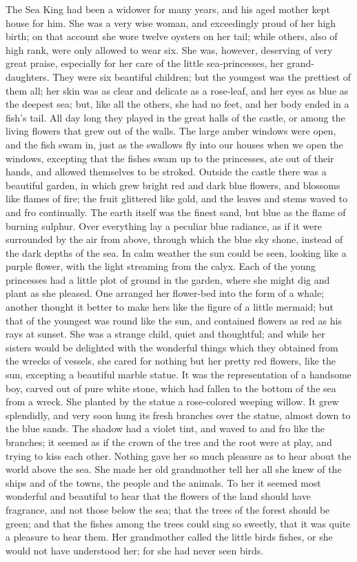 The Sea King had been a widower for many years, and his aged
mother kept house for him. 
She was a very wise woman, and
exceedingly proud of her high birth; on that account she wore twelve
oysters on her tail; while others, also of high rank, were only
allowed to wear six. 
She was, however, deserving of very great praise,
especially for her care of the little sea-princesses, her
grand-daughters. 
They were six beautiful children; but the youngest
was the prettiest of them all; her skin was as clear and delicate as a
rose-leaf, and her eyes as blue as the deepest sea; but, like all
the others, she had no feet, and her body ended in a fish's tail.
All day long they played in the great halls of the castle, or among
the living flowers that grew out of the walls. 
The large amber windows
were open, and the fish swam in, just as the swallows fly into our
houses when we open the windows, excepting that the fishes swam up
to the princesses, ate out of their hands, and allowed themselves to
be stroked. 
Outside the castle there was a beautiful garden, in
which grew bright red and dark blue flowers, and blossoms like
flames of fire; the fruit glittered like gold, and the leaves and
stems waved to and fro continually. 
The earth itself was the finest
sand, but blue as the flame of burning sulphur. 
Over everything lay
a peculiar blue radiance, as if it were surrounded by the air from
above, through which the blue sky shone, instead of the dark depths of
the sea. 
In calm weather the sun could be seen, looking like a
purple flower, with the light streaming from the calyx. 
Each of the
young princesses had a little plot of ground in the garden, where
she might dig and plant as she pleased. 
One arranged her flower-bed
into the form of a whale; another thought it better to make hers
like the figure of a little mermaid; but that of the youngest was
round like the sun, and contained flowers as red as his rays at
sunset. 
She was a strange child, quiet and thoughtful; and while her
sisters would be delighted with the wonderful things which they
obtained from the wrecks of vessels, she cared for nothing but her
pretty red flowers, like the sun, excepting a beautiful marble statue.
It was the representation of a handsome boy, carved out of pure
white stone, which had fallen to the bottom of the sea from a wreck.
She planted by the statue a rose-colored weeping willow. 
It grew
splendidly, and very soon hung its fresh branches over the statue,
almost down to the blue sands. 
The shadow had a violet tint, and waved
to and fro like the branches; it seemed as if the crown of the tree
and the root were at play, and trying to kiss each other. 
Nothing gave
her so much pleasure as to hear about the world above the sea. 
She
made her old grandmother tell her all she knew of the ships and of the
towns, the people and the animals. 
To her it seemed most wonderful and
beautiful to hear that the flowers of the land should have
fragrance, and not those below the sea; that the trees of the forest
should be green; and that the fishes among the trees could sing so
sweetly, that it was quite a pleasure to hear them. 
Her grandmother
called the little birds fishes, or she would not have understood
her; for she had never seen birds.

